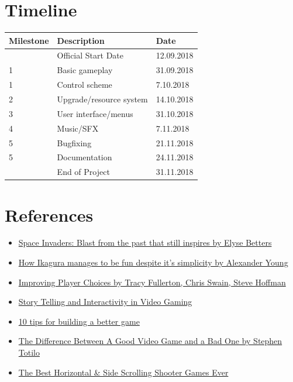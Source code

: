 \documentclass[a4paper]{scrreprt}
\begin{document}
\chapter{Timeline}
\begin{table}[h]
\centering
\begin{tabular}{|l|l|l|}
\hline
\textbf{Milestone} & \textbf{Description} & \textbf{Date} \\\hline
& Official Start Date & 12.09.2018 \\
1 & Basic gameplay & 31.09.2018 \\
1 & Control scheme & 7.10.2018 \\
2 & Upgrade/resource system  & 14.10.2018 \\
3 & User interface/menus &31.10.2018 \\
4 & Music/SFX & 7.11.2018 \\
5 & Bugfixing & 21.11.2018 \\
5 & Documentation & 24.11.2018 \\
& End of Project & 31.11.2018 \\
\hline
\end{tabular}
\end{table}

\chapter{References}
  \begin{itemize}
    \item \href {https://www.bbc.com/news/technology-22714047}{Space Invaders: Blast from the past that still inspires by Elyse Betters}
    \item \href {https://gameoveragain.com/ikaruga-dreamcast/}{How Ikagura manages to be fun despite it's simplicity by Alexander Young}
    \item \href {https://www.gamasutra.com/view/feature/130452/improving_player_choices.php}{Improving Player Choices by  Tracy Fullerton, Chris Swain, Steve Hoffman}
    \item \href {https://the-artifice.com/video-gaming-story-telling-interactivity/}{Story Telling and Interactivity in Video Gaming}
    \item \href {https://www.creativebloq.com/inspiration/10-tips-building-better-game-5126304}{10 tips for building a better game}
	\item \href {https://kotaku.com/5924387/the-difference-between-a-good-video-game-and-a-bad-one}{The Difference Between A Good Video Game and a Bad One by Stephen Totilo}
    \item \href {https://www.ranker.com/list/all-scrolling-shooter-games-list/reference}{The Best Horizontal & Side Scrolling Shooter Games Ever}
  \end{itemize}
 

\end{document}
